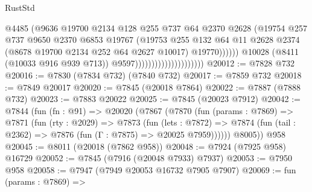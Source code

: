 \begin{lexlean}{RustStd}
\begin{coremodule}
                                                    @4485
                                                    (@9636
                                                      @19700
                                                      @2134
                                                      @128
                                                      @255
                                                      @737
                                                      @64
                                                      @2370
                                                      @2628
                                                      (@19754
                                                        @257
                                                        @737
                                                        @9650
                                                        @2370
                                                        @6853
                                                        @19767
                                                        (@19753
                                                          @255
                                                          @132
                                                          @64
                                                          @11
                                                          @2628
                                                          @2374
                                                          (@8678 @19700 @2134 @252 @64 @2627 @10017)
                                                          @19770))))))
                                              @10028
                                              (@8411 (@10033 @916 @939 @713))
                                              @9597)))))))))))))))))))))
@20012 := @7828 @732
@20016 := @7830 (@7834 @732) (@7840 @732)
@20017 := @7859 @732
@20018 := @7849 @20017
@20020 := @7845 (@20018 @7864)
@20022 := @7887 (@7888 @732)
@20023 := @7883 @20022
@20025 := @7845 (@20023 @7912)
@20042 := @7844
    (fun (fn : @91) =>
    @20020
      (@7867
        (@7870
          (fun (params : @7869) =>
          @7871
            (fun (rty : @2029) =>
            @7873
              (fun (lets : @7872) =>
              @7874 (fun (tail : @2362) => @7876 (fun (Γ : @7875) => @20025 @7959))))))
        @8005))
    @958
@20045 := @8011 (@20018 (@7862 @958))
@20048 := @7924 (@7925 @958) @16729
@20052 := @7845 (@7916 (@20048 @7933) @7937)
@20053 := @7950 @958
@20058 := @7947 (@7949 @20053 @16732 @7905 @7907)
@20069 := fun (params : @7869) =>

\end{coremodule}
\end{lexlean}
